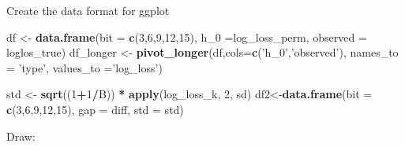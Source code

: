 \documentclass[]{article}
\newenvironment{Shaded}{\begin{snugshade}}{\end{snugshade}}
\newcommand{\DataTypeTok}[1]{\textcolor[rgb]{0.13,0.29,0.53}{#1}}
\newcommand{\DecValTok}[1]{\textcolor[rgb]{0.00,0.00,0.81}{#1}}
\newcommand{\KeywordTok}[1]{\textcolor[rgb]{0.13,0.29,0.53}{\textbf{#1}}}
\newcommand{\NormalTok}[1]{#1}
\newcommand{\OperatorTok}[1]{\textcolor[rgb]{0.81,0.36,0.00}{\textbf{#1}}}
\newcommand{\StringTok}[1]{\textcolor[rgb]{0.31,0.60,0.02}{#1}}
\begin{document}
Create the data format for ggplot

\begin{Shaded}
\begin{Highlighting}[]
\NormalTok{df <-}\StringTok{ }\KeywordTok{data.frame}\NormalTok{(}\DataTypeTok{bit =} \KeywordTok{c}\NormalTok{(}\DecValTok{3}\NormalTok{,}\DecValTok{6}\NormalTok{,}\DecValTok{9}\NormalTok{,}\DecValTok{12}\NormalTok{,}\DecValTok{15}\NormalTok{), }\DataTypeTok{h_0 =}\NormalTok{log_loss_perm, }\DataTypeTok{observed =}\NormalTok{ loglos_true)}
\NormalTok{df_longer <-}\StringTok{ }\KeywordTok{pivot_longer}\NormalTok{(df,}\DataTypeTok{cols=}\KeywordTok{c}\NormalTok{(}\StringTok{'h_0'}\NormalTok{,}\StringTok{'observed'}\NormalTok{), }\DataTypeTok{names_to =} \StringTok{'type'}\NormalTok{, }\DataTypeTok{values_to =}\StringTok{'log_loss'}\NormalTok{)}

\NormalTok{std <-}\StringTok{ }\KeywordTok{sqrt}\NormalTok{((}\DecValTok{1}\OperatorTok{+}\DecValTok{1}\OperatorTok{/}\NormalTok{B)) }\OperatorTok{*}\StringTok{ }\KeywordTok{apply}\NormalTok{(log_loss_k, }\DecValTok{2}\NormalTok{, sd)}
\NormalTok{df2<-}\KeywordTok{data.frame}\NormalTok{(}\DataTypeTok{bit =} \KeywordTok{c}\NormalTok{(}\DecValTok{3}\NormalTok{,}\DecValTok{6}\NormalTok{,}\DecValTok{9}\NormalTok{,}\DecValTok{12}\NormalTok{,}\DecValTok{15}\NormalTok{), }\DataTypeTok{gap =}\NormalTok{ diff, }\DataTypeTok{std =}\NormalTok{ std)}
\end{Highlighting}
\end{Shaded}

Draw:
\end{document}
